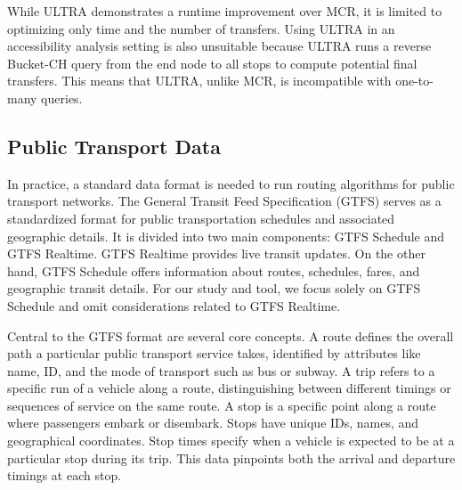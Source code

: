 While ULTRA demonstrates a runtime improvement over MCR, it is limited to optimizing only time and the number of transfers.
Using ULTRA in an accessibility analysis setting is also unsuitable because ULTRA runs a reverse Bucket-CH query from the end node to all stops to compute potential final transfers.
This means that ULTRA, unlike MCR, is incompatible with one-to-many queries.







\subsection{Public Transport Data}
\label{subsec:public_transport_data}

In practice, a standard data format is needed to run routing algorithms for public transport networks.
The General Transit Feed Specification (GTFS)  serves as a standardized format for public transportation schedules and associated geographic details.
It is divided into two main components: GTFS Schedule and GTFS Realtime.
GTFS Realtime provides live transit updates.
On the other hand, GTFS Schedule offers information about routes, schedules, fares, and geographic transit details.
For our study and tool, we focus solely on GTFS Schedule and omit considerations related to GTFS Realtime.

Central to the GTFS format are several core concepts.
A route defines the overall path a particular public transport service takes, identified by attributes like name, ID, and the mode of transport such as bus or subway.
A trip refers to a specific run of a vehicle along a route, distinguishing between different timings or sequences of service on the same route.
A stop is a specific point along a route where passengers embark or disembark.
Stops have unique IDs, names, and geographical coordinates.
Stop times specify when a vehicle is expected to be at a particular stop during its trip.
This data pinpoints both the arrival and departure timings at each stop.

